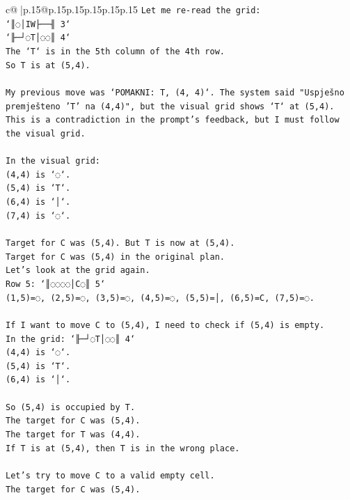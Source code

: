 \documentclass{article}
\begin{document}
{\begin{supertabular}{c@{$\;$}|p{.15\linewidth}@{}p{.15\linewidth}p{.15\linewidth}p{.15\linewidth}p{.15\linewidth}p{.15\linewidth}}
{{{\texttt{Let me re{-}read the grid:} \\
\texttt{`║◌│IW├──╢ 3`} \\
\texttt{`╟─┘◌T│◌◌║ 4`} \\
\texttt{The `T` is in the 5th column of the 4th row.} \\
\texttt{So T is at (5,4).} \\
\\ 
\texttt{My previous move was `POMAKNI: T, (4, 4)`. The system said "Uspješno premješteno 'T' na (4,4)", but the visual grid shows `T` at (5,4). This is a contradiction in the prompt's feedback, but I must follow the visual grid.} \\
\\ 
\texttt{In the visual grid:} \\
\texttt{(4,4) is `◌`.} \\
\texttt{(5,4) is `T`.} \\
\texttt{(6,4) is `│`.} \\
\texttt{(7,4) is `◌`.} \\
\\ 
\texttt{Target for C was (5,4). But T is now at (5,4).} \\
\texttt{Target for C was (5,4) in the original plan.} \\
\texttt{Let's look at the grid again.} \\
\texttt{Row 5: `║◌◌◌◌│C◌║ 5`} \\
\texttt{(1,5)=◌, (2,5)=◌, (3,5)=◌, (4,5)=◌, (5,5)=│, (6,5)=C, (7,5)=◌.} \\
\\ 
\texttt{If I want to move C to (5,4), I need to check if (5,4) is empty.} \\
\texttt{In the grid: `╟─┘◌T│◌◌║ 4`} \\
\texttt{(4,4) is `◌`.} \\
\texttt{(5,4) is `T`.} \\
\texttt{(6,4) is `│`.} \\
\\ 
\texttt{So (5,4) is occupied by T.} \\
\texttt{The target for C was (5,4).} \\
\texttt{The target for T was (4,4).} \\
\texttt{If T is at (5,4), then T is in the wrong place.} \\
\\ 
\texttt{Let's try to move C to a valid empty cell.} \\
\texttt{The target for C was (5,4).} \\
}}}
\end{supertabular}}
\end{document}
